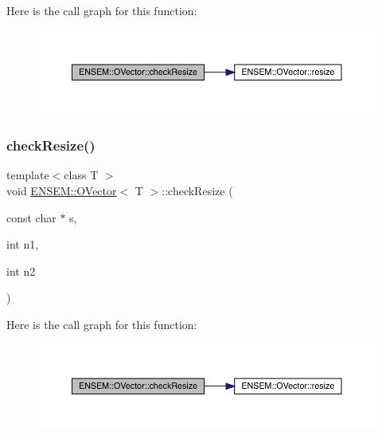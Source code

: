 Here is the call graph for this function\+:
\nopagebreak
\begin{figure}[H]
\begin{center}
\leavevmode
\includegraphics[width=350pt]{d0/d8d/classENSEM_1_1OVector_a95545451bb9d6be83ba32ad3dc2dab42_cgraph}
\end{center}
\end{figure}
\mbox{\label{classENSEM_1_1OVector_acd8960fbc5b7df8aabf14ca8ca50f7ab}} 
\subsubsection{\texorpdfstring{checkResize()}{checkResize()}\hspace{0.1cm}{\footnotesize\ttfamily [4/9]}}
{\footnotesize\ttfamily template$<$class T $>$ \\
void \mbox{\hyperlink{classENSEM_1_1OVector}{E\+N\+S\+E\+M\+::\+O\+Vector}}$<$ T $>$\+::check\+Resize (\begin{DoxyParamCaption}\item[{const char $\ast$}]{s,  }\item[{int}]{n1,  }\item[{int}]{n2 }\end{DoxyParamCaption})\hspace{0.3cm}{\ttfamily [inline]}}

Here is the call graph for this function\+:
\nopagebreak
\begin{figure}[H]
\begin{center}
\leavevmode
\includegraphics[width=350pt]{d0/d8d/classENSEM_1_1OVector_acd8960fbc5b7df8aabf14ca8ca50f7ab_cgraph}
\end{center}
\end{figure}
\mbox{\label{classENSEM_1_1OVector_acd8960fbc5b7df8aabf14ca8ca50f7ab}} 
